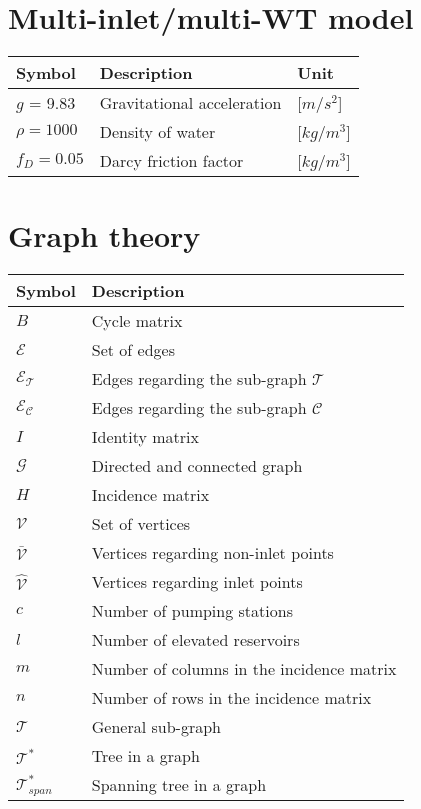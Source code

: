 \section*{Multi-inlet/multi-WT model}

\begin{tabular}{l l l} 
	\textbf{Symbol}		&	\textbf{Description}							& \hspace{64mm}\textbf{Unit}			\\\hline						
	$g$ = 9.83 			&	Gravitational acceleration						& \hspace{64mm}[$m/s^2$]\\
	$\rho = 1000$		&	Density of water								& \hspace{64mm}[$kg/m^3$]\\
	$f_D = 0.05$		&	Darcy friction factor							& \hspace{64mm}[$kg/m^3$]\\
\end{tabular}

\newpage

\section*{Graph theory}

\begin{tabular}{l l} 
	\textbf{Symbol}		&	\textbf{Description}										\\\hline
	$B$		&	Cycle matrix		    												\\
	$\mathcal{E}$		&	Set of edges		    									\\
	$\mathcal{E_T}$		&	Edges regarding the sub-graph $\mathcal{T}$ 		    	\\
	$\mathcal{E_C}$		&	Edges regarding the sub-graph $\mathcal{C}$ 		    	\\
	$I$					&	Identity matrix		    									\\
	$\mathcal{G}$		&	Directed and connected graph								\\
	$H$		&	Incidence matrix		    											\\
	$\mathcal{V}$		&	Set of vertices		    									\\
	$\bar{\mathcal{V}}$ &	Vertices regarding non-inlet points	    					\\
	$\hat{\mathcal{V}}$ &	Vertices regarding inlet points	    						\\
	$c$		&	Number of pumping stations												\\
	$l$		&	Number of elevated reservoirs											\\
	$m$		&	Number of columns in the incidence matrix								\\
	$n$		&	Number of rows in the incidence matrix									\\
	$\mathcal{T}$		&	General sub-graph 		    								\\
	$\mathcal{T^*}$		&	Tree in a graph		    									\\
	$\mathcal{T}^*_{span}$		&	Spanning tree in a graph	    					\\



\end{tabular}	

